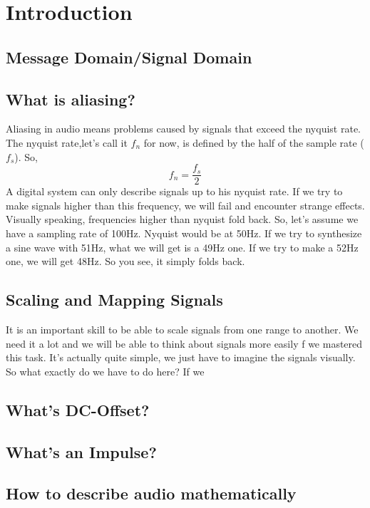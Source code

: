 \chapter{Introduction}
\label{introduction}

\section{Message Domain/Signal Domain}

\section{What is aliasing?}
Aliasing in audio means problems caused by signals that exceed the nyquist rate.\\
The nyquist rate,let's call it $f_n$ for now, is defined by the half of the sample rate ($f_s$). So, 
\begin{equation}
	f_n=\frac{f_s}{2}
\end{equation}
A digital system can only describe signals up to his nyquist rate. If we try to make signals higher than this frequency, we will fail and encounter strange effects.\\
Visually speaking, frequencies higher than nyquist fold back. So, let's assume we have a sampling rate of 100Hz. Nyquist would be at 50Hz. If we try to synthesize a sine wave with 51Hz, what we will get is a 49Hz one. If we try to make a 52Hz one, we will get 48Hz. So you see, it simply folds back.



\section{Scaling and Mapping Signals}
It is an important skill to be able to scale signals from one range to another. We need it a lot and we will be able to think about signals more easily f we mastered this task. It's actually quite simple, we just have to imagine the signals visually.\\
So what exactly do we have to do here? If we 


\section{What's DC-Offset?}

\section{What's an Impulse?}

\section{How to describe audio mathematically}



